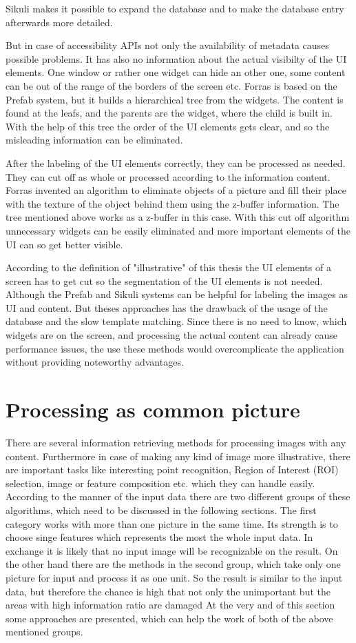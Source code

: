 \documentclass[draft,final]{vutinfth} %
\begin{document}
Sikuli makes it possible to expand the database and to make the database entry afterwards more detailed.\par
But in case of accessibility APIs not only the availability of metadata causes possible problems.
It has also no information about the actual visibilty of the UI elements.
One window or rather one widget can hide an other one, some content can be out of the range of the borders of the screen etc.    
Forras is based on the Prefab system, but it builds a hierarchical tree from the widgets. 
The content is found at the leafs, and the parents are the widget, where the child is built in.
With the help of this tree the order of the UI elements gets clear, and so the misleading information can be eliminated.\par
After the labeling of the UI elements correctly, they can be processed as needed.
They can cut off as whole or processed according to the information content.
Forras invented an algorithm to eliminate objects of a picture and fill their place with the texture of the object behind them using the z-buffer information.
The tree mentioned above works as a z-buffer in this case.
With this cut off algorithm unnecessary widgets can be easily eliminated and more important elements of the UI can so get better visible.\par
According to the definition of "illustrative" of this thesis the UI elements of a screen has to get cut so the segmentation of the UI elements is not needed.
Although the Prefab and Sikuli systems can be helpful for labeling the images as UI and content.
But theses approaches has the drawback of the usage of the database and the slow template matching. 
Since there is no need to know, which widgets are on the screen, and processing the actual content can already cause performance issues, the use these methods would overcomplicate the application without providing noteworthy advantages.

\section{Processing as common picture}
There are several information retrieving methods for processing images with any content.
Furthermore in case of making any kind of image more illustrative, there are important tasks like interesting point recognition, Region of Interest (ROI) selection, image or feature composition etc. which they can handle easily.
According to the manner of the input data there are two different groups of these algorithms, which need to be discussed in the following sections.
The first category works with more than one picture in the same time.
Its strength is to choose singe features which represents the most the whole input data. 
In exchange it is likely that no input image will be recognizable on the result.
On the other hand there are the methods in the second group, which take only one picture for input and process it as one unit.
So the result is similar to the input data, but therefore the chance is high that not only the unimportant but the areas with high information ratio are damaged
At the very and of this section some approaches are presented, which can help the work of both of the above mentioned groups.
\end{document}
